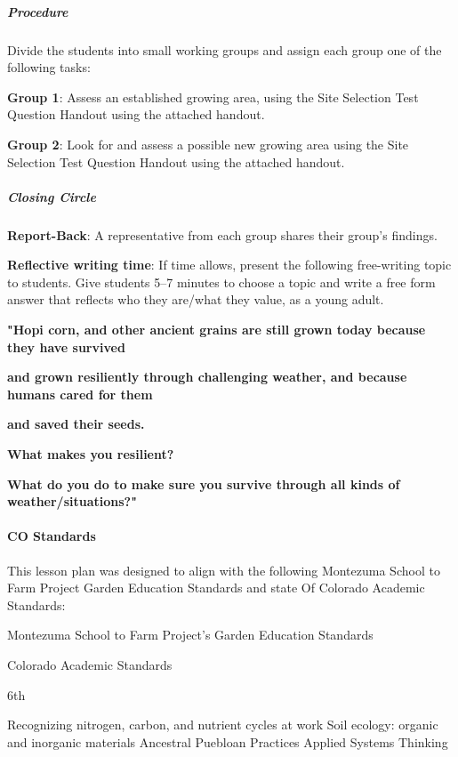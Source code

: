 \documentclass[12pt,]{article}
\let\oldparagraph\paragraph
\renewcommand{\paragraph}[1]{\oldparagraph{#1}\mbox{}}
\let\oldsubparagraph\subparagraph
\renewcommand{\subparagraph}[1]{\oldsubparagraph{#1}\mbox{}}
\begin{document}
\hypertarget{procedure-3}{%
\subparagraph{Procedure}\label{procedure-3}}

Divide the students into small working groups and assign each group one of the following tasks:

\textbf{Group 1}: Assess an established growing area, using the Site Selection Test Question Handout using the attached handout.

\textbf{Group 2}: Look for and assess a possible new growing area using the Site Selection Test Question Handout using the attached handout.

\hypertarget{closing-circle-2}{%
\subparagraph{Closing Circle}\label{closing-circle-2}}

\textbf{Report-Back}: A representative from each group shares their group's findings.

\textbf{Reflective writing time}: If time allows, present the following free-writing topic to students. Give students 5--7 minutes to choose a topic and write a free form answer that reflects who they are/what they value, as a young adult.

\textbf{"Hopi corn, and other ancient grains are still grown today because they have survived }

\textbf{and grown resiliently through challenging weather, and because humans cared for them }

\textbf{and saved their seeds. }

\textbf{What makes you resilient? }

\textbf{What do you do to make sure you survive through all kinds of weather/situations?"}

\hypertarget{co-standards-2}{%
\paragraph{CO Standards}\label{co-standards-2}}

This lesson plan was designed to align with the following Montezuma School to Farm Project Garden Education Standards and state Of Colorado Academic Standards:

Montezuma School to Farm Project's Garden Education Standards

Colorado Academic Standards

6th

Recognizing nitrogen, carbon, and nutrient cycles at work
Soil ecology: organic and inorganic materials
Ancestral Puebloan Practices
Applied Systems Thinking
\end{document}
